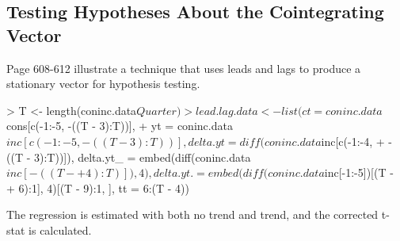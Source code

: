 \subsection{Testing Hypotheses About the Cointegrating Vector}
Page 608-612 illustrate a technique that uses leads and lags to produce a stationary
vector for hypothesis testing.
\begin{Schunk}
\begin{Sinput}
> T <- length(coninc.data$Quarter)
> lead.lag.data <- list(ct = coninc.data$cons[c(-1:-5, -((T - 3):T))], 
+     yt = coninc.data$inc[c(-1:-5, -((T - 3):T))], delta.yt = diff(coninc.data$inc[c(-1:-4, 
+         -((T - 3):T))]), delta.yt_ = embed(diff(coninc.data$inc[-((T - 
+         4):T)]), 4), delta.yt. = embed(diff(coninc.data$inc[-1:-5])[(T - 
+         6):1], 4)[(T - 9):1, ], tt = 6:(T - 4))
\end{Sinput}
\end{Schunk}
The regression is estimated with both no trend and trend, and the corrected t-stat is calculated.
